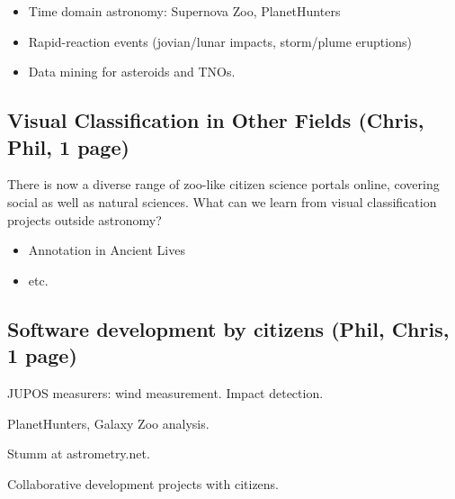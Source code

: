 \documentclass{ar2e}
\begin{document}
\begin{itemize}


\item Time domain astronomy: Supernova Zoo, PlanetHunters
\item Rapid-reaction events (jovian/lunar impacts, storm/plume eruptions)
\item Data mining for asteroids and TNOs.
\end{itemize}



\subsection{Visual Classification in Other Fields (\textbf{Chris}, Phil, 1 page)}
\label{sec:class:non-astro}

There is now a diverse range of zoo-like citizen science portals online,
covering social as well as natural sciences. What can we learn from visual
classification projects outside astronomy?

\begin{itemize}
\item Annotation in Ancient Lives
\item etc.
\end{itemize}




\subsection{Software development by citizens (\textbf{Phil}, Chris, 1 page)}
\label{sec:instr:software}

JUPOS measurers: wind measurement. 
Impact detection.

PlanetHunters, Galaxy Zoo analysis.

Stumm at astrometry.net.  

Collaborative development projects with citizens. 



\end{document}
